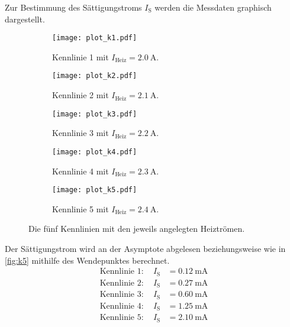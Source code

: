 Zur Bestimmung des Sättigungstroms $I_{\text{S}}$ werden die Messdaten graphisch dargestellt.
\begin{figure}
  \centering
  
  \begin{subfigure}{0.49\columnwidth}
  \centering
  \texttt{[image: plot\_k1.pdf]}
  \caption{Kennlinie 1 mit $I_\text{Heiz} = \qty{2,0}{\ampere}$.}
  \label{fig:k1}
  \end{subfigure}\hfill
  \begin{subfigure}{0.49\columnwidth}
  \centering
  \texttt{[image: plot\_k2.pdf]}
  \caption{Kennlinie 2 mit $I_\text{Heiz} = \qty{2,1}{\ampere}$.}
  \label{fig:k2}
  \end{subfigure}
  
  \medskip
  
  \begin{subfigure}{0.49\columnwidth}
  \centering
  \texttt{[image: plot\_k3.pdf]}
  \caption{Kennlinie 3 mit $I_\text{Heiz} = \qty{2,2}{\ampere}$.}
  \label{fig:k3}
  \end{subfigure}\hfill
  \begin{subfigure}{0.49\columnwidth}
  \centering
  \texttt{[image: plot\_k4.pdf]}
  \caption{Kennlinie 4 mit $I_\text{Heiz} = \qty{2,3}{\ampere}$.}
  \label{fig:k4}
  \end{subfigure}
  
  \medskip
  
  \begin{subfigure}{0.49\columnwidth}
  \centering
  \texttt{[image: plot\_k5.pdf]}
  \caption{Kennlinie 5 mit $I_\text{Heiz} = \qty{2,4}{\ampere}$.}
  \label{fig:k5}
  \end{subfigure}
  
  \caption{Die fünf Kennlinien mit den jeweils angelegten Heiztrömen.}
  \label{fig:k}
\end{figure}

Der Sättigungstrom wird an der Asymptote abgelesen beziehungsweise wie in \autoref{fig:k5} 
mithilfe des Wendepunktes berechnet.
\begin{align*}
  \text{Kennlinie 1} : \quad I_\text{S} &= \qty{0,12}{\milli\ampere} \\
  \text{Kennlinie 2} : \quad I_\text{S} &= \qty{0,27}{\milli\ampere} \\
  \text{Kennlinie 3} : \quad I_\text{S} &= \qty{0,60}{\milli\ampere} \\
  \text{Kennlinie 4} : \quad I_\text{S} &= \qty{1,25}{\milli\ampere} \\
  \text{Kennlinie 5} : \quad I_\text{S} &= \qty{2,10}{\milli\ampere}
\end{align*}


